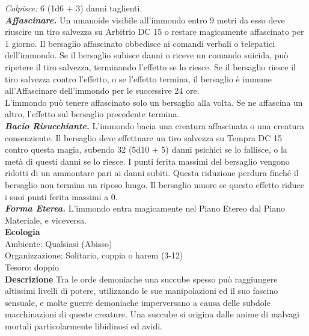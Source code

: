 \begin{multicols}{2}
\emph{Colpisce:} 6 (1d6 + 3) danni taglienti.\\
\emph{\textbf{Affascinare.}} Un umanoide visibile all'immondo entro 9 metri da esso deve riuscire un tiro salvezza su Arbitrio DC 15 o restare magicamente affascinato per 1 giorno. Il bersaglio affascinato obbedisce ai comandi verbali o telepatici dell'immondo. Se il bersaglio subisce danni o riceve un comando suicida, può ripetere il tiro salvezza, terminando l'effetto se lo riesce. Se il bersaglio riesce il tiro salvezza contro l'effetto, o se l'effetto termina, il bersaglio è immune all'Affascinare dell'immondo per le successive 24 ore.\\
L'immondo può tenere affascinato solo un bersaglio alla volta. Se ne affascina un altro, l'effetto sul bersaglio precedente termina.\\
\emph{\textbf{Bacio Risucchiante.}} L'immondo bacia una creatura affascinata o una creatura consenziente. Il bersaglio deve effettuare un tiro salvezza su Tempra DC 15 contro questa magia, subendo 32 (5d10 + 5) danni psichici se lo fallisce, o la metà di questi danni se lo riesce. I punti ferita massimi del bersaglio vengono ridotti di un ammontare pari ai danni subiti. Questa riduzione perdura finché il bersaglio non termina un riposo lungo. Il bersaglio muore se questo effetto riduce i suoi punti ferita massimi a 0.\\
\emph{\textbf{Forma Eterea.}} L'immondo entra magicamente nel Piano Etereo dal Piano Materiale, e viceversa.\\
\textbf{Ecologia}\\
Ambiente: Qualsiasi (Abisso)\\
Organizzazione: Solitario, coppia o harem (3-12)\\
Tesoro: doppio\\
\textbf{Descrizione}
Tra le orde demoniache una succube spesso può raggiungere altissimi livelli di potere, utilizzando le sue manipolazioni ed il suo fascino sensuale, e molte guerre demoniache imperversano a causa delle subdole macchinazioni di queste creature. Una succube si origina dalle anime di malvagi mortali particolarmente libidinosi ed avidi.\\



\end{multicols}
